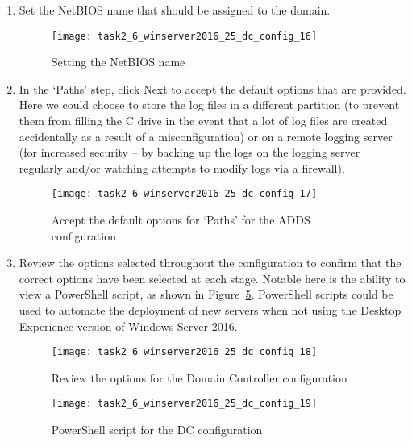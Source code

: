 \begin{enumerate}[series=task2methodology3]
\begin{enumerate}[label=(\alph*)]
\begin{figure}[H]
          \label{fig:task2:vspherec_windc2_c15}
        \end{figure}
      \item Set the NetBIOS name that should be assigned to the domain.
        \begin{figure}[H]
          \centering
          \captionsetup{skip=2pt}
          \texttt{[image: task2\_6\_winserver2016\_25\_dc\_config\_16]}
          \caption{Setting the NetBIOS name}
          \label{fig:task2:vspherec_windc2_c16}
        \end{figure}
      \item In the `Paths' step, click Next to accept the default options that are provided. Here we could choose to store the log files in a different partition (to prevent them from filling the C drive in the event that a lot of log files are created accidentally as a result of a misconfiguration) or on a remote logging server (for increased security -- by backing up the logs on the logging server regularly and/or watching attempts to modify logs via a firewall).
        \begin{figure}[H]
          \centering
          \captionsetup{skip=2pt}
          \texttt{[image: task2\_6\_winserver2016\_25\_dc\_config\_17]}
          \caption{Accept the default options for `Paths' for the ADDS configuration}
          \label{fig:task2:vspherec_windc2_c17}
        \end{figure}
      \item Review the options selected throughout the configuration to confirm that the correct options have been selected at each stage. Notable here is the ability to view a PowerShell script, as shown in Figure~\ref{fig:task2:vspherec_windc2_c19}. PowerShell scripts could be used to automate the deployment of new servers when not using the Desktop Experience version of Windows Server 2016.
        \begin{figure}[H]
          \centering
          \captionsetup{skip=2pt}
          \texttt{[image: task2\_6\_winserver2016\_25\_dc\_config\_18]}
          \caption{Review the options for the Domain Controller configuration}
          \label{fig:task2:vspherec_windc2_c18}
        \end{figure}
        \begin{figure}[H]
          \centering
          \captionsetup{skip=2pt}
          \texttt{[image: task2\_6\_winserver2016\_25\_dc\_config\_19]}
          \caption{PowerShell script for the DC configuration}
          \label{fig:task2:vspherec_windc2_c19}

\end{figure}
\end{enumerate}
\end{enumerate}
